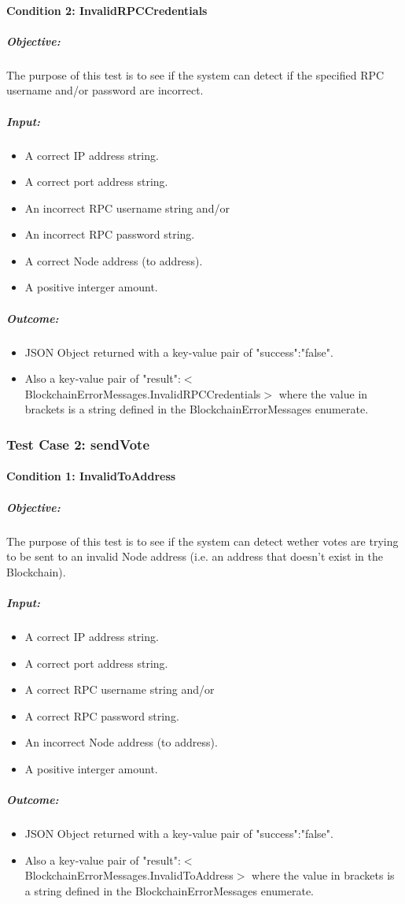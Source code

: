 \documentclass[11pt]{article}
\begin{document}
	\paragraph{Condition 2: InvalidRPCCredentials}	
	\subparagraph{Objective:}
	The purpose of this test is to see if the system can detect if the specified RPC username and/or password are incorrect.
	\subparagraph{Input:}
	\begin{itemize}
		\item A correct IP address string.
		\item A correct port address string.
		\item An incorrect RPC username string and/or
		\item An incorrect RPC password string.
		\item A correct Node address (to address).
		\item A positive interger amount.
	\end{itemize}
	\subparagraph{Outcome:}
	\begin{itemize}
		\item JSON Object returned with a key-value pair of "success":"false".
		\item Also a key-value pair of "result":$<$BlockchainErrorMessages.InvalidRPCCredentials$>$ where the value in brackets is a string defined in the BlockchainErrorMessages enumerate.
	\end{itemize}
	
	\subsubsection{Test Case 2: sendVote}
	\paragraph{Condition 1: InvalidToAddress}	
	\subparagraph{Objective:}
	The purpose of this test is to see if the system can detect wether votes are trying to be sent to an invalid Node address (i.e. an address that doesn't exist in the Blockchain).
	\subparagraph{Input:}
	\begin{itemize}
		\item A correct IP address string.
		\item A correct port address string.
		\item A correct RPC username string and/or
		\item A correct RPC password string.
		\item An incorrect Node address (to address).
		\item A positive interger amount.
	\end{itemize}
	\subparagraph{Outcome:}
	\begin{itemize}
		\item JSON Object returned with a key-value pair of "success":"false".
		\item Also a key-value pair of "result":$<$BlockchainErrorMessages.InvalidToAddress$>$ where the value in brackets is a string defined in the BlockchainErrorMessages enumerate.
	\end{itemize}
	
\end{document}
